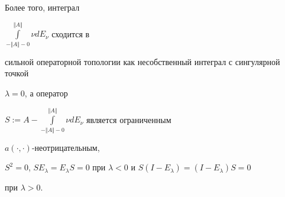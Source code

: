 \begin{thm}
\begin{itemize}
\end{itemize}





Более того, интеграл


$\int\limits_{-\Vert A\Vert -0}^{\Vert A\Vert}\nu dE_{\nu}$ сходится в


сильной операторной топологии как несобственный интеграл с сингулярной точкой


$\lambda =0$, а оператор


$S:=A-\int\limits_{-\Vert A\Vert -0}^{\Vert A\Vert}\nu


dE_{\nu}$ является ограниченным


$a(\cdot,\cdot)$-неотрицательным,


$S^{2}=0$, $SE_{\lambda}=


E_{\lambda}S=0$ при $\lambda <0$ и $S(I-E_{\lambda})=(I-E_{\lambda})S=0$


при $\lambda >0$.


\end{thm}





